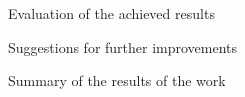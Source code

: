 Evaluation of the achieved results

Suggestions for further improvements

Summary of the results of the work